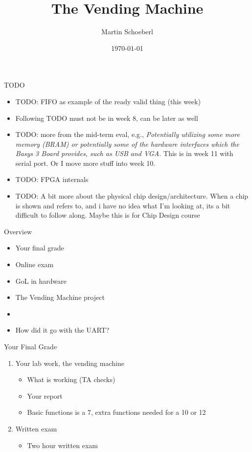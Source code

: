 

\newif\ifbook


\title{The Vending Machine}
\author{Martin Schoeberl}
\date{\today}



\begin{frame}
\titlepage
\end{frame}

\begin{frame}[fragile]{TODO}
\begin{itemize}
\item TODO: FIFO as example of the ready valid thing (this week)
\item Following TODO must not be in week 8, can be later as well
\item TODO: more from the mid-term eval, e.g., \emph{Potentially utilizing some more memory (BRAM) or potentially some of the hardware interfaces which the Basys 3 Board provides, such as USB and VGA.} This is in week 11 with serial port. Or I move more stuff into week 10.
\item TODO: FPGA internals
\item TODO: A bit more about the physical chip design/architecture. When a chip is shown and refers to, and i have no idea what I'm looking at, its a bit difficult to follow along. Maybe this is for Chip Design course
\end{itemize}
\end{frame}

\begin{frame}[fragile]{Overview}
\begin{itemize}
\item Your final grade
\item Online exam
\item GoL in hardware
\item The Vending Machine project
\item
\item How did it go with the UART?
\end{itemize}
\end{frame}

\begin{frame}[fragile]{Your Final Grade}
\begin{enumerate}
\item Your lab work, the vending machine
\begin{itemize}
\item What is working (TA checks)
\item Your report
\item Basic functions is a 7, extra functions needed for a 10 or 12
\end{itemize}
\item Written exam
\begin{itemize}
\item Two hour written exam
\end{itemize}
\end{enumerate}
\end{frame}

